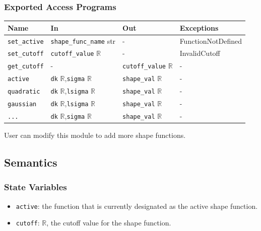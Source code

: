 \documentclass[12pt, titlepage]{article}
\begin{document}
\subsubsection{Exported Access Programs}
\begin{center}
\begin{tabular}{p{3cm} p{4cm} p{3cm} p{3.5cm}}
\hline
\textbf{Name} & \textbf{In} & \textbf{Out} & \textbf{Exceptions} \\
\hline
\texttt{set\_active} & \texttt{shape\_func\_name} str & - & FunctionNotDefined \\
\texttt{set\_cutoff} & \texttt{cutoff\_value} $\mathbb{R}$ & - & InvalidCutoff \\
\texttt{get\_cutoff} & - & \texttt{cutoff\_value} $\mathbb{R}$ & - \\
\texttt{active}& \texttt{dk} $\mathbb{R}$,\newline\texttt{sigma} $\mathbb{R}$ & \texttt{shape\_val} $\mathbb{R}$ & - \\
\texttt{quadratic}& \texttt{dk} $\mathbb{R}$,\newline\texttt{lsigma} $\mathbb{R}$ & \texttt{shape\_val} $\mathbb{R}$ & - \\
\texttt{gaussian}& \texttt{dk} $\mathbb{R}$,\newline\texttt{lsigma} $\mathbb{R}$ & \texttt{shape\_val} $\mathbb{R}$ & - \\
\texttt{...}& \texttt{dk} $\mathbb{R}$,\newline\texttt{sigma} $\mathbb{R}$ & \texttt{shape\_val} $\mathbb{R}$ & - \\
\hline
\end{tabular}
\end{center}
User can modify this module to add more shape functions.

\subsection{Semantics}

\subsubsection{State Variables}
\begin{itemize}
  \item \texttt{active}: the function that is currently designated as the active shape function.
  \item \texttt{cutoff}: $\mathbb{R}$, the cutoff value for the shape function. 
\end{itemize}
\end{document}
